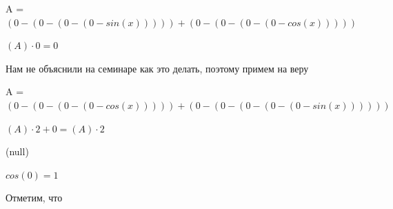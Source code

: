 \documentclass[12pt,a4paper,fleqn]{article}
\begin{document}
\begin{center}
\begin{center}
\begin{center}
\begin{center}
\begin{center}
\begin{center}
\begin{center}
\begin{center}
\begin{center}
\begin{center}
\begin{center}
\begin{center}
\begin{center}
\begin{center}
\begin{center}
\begin{center}
\begin{center}
\begin{center}
\begin{center}
\begin{center}
\begin{center}
\begin{center}
\begin{center}
\begin{center}
\begin{center}
\begin{center}
\begin{center}
\begin{center}
\begin{center}
\begin{center}
\begin{center}
\begin{center}
\begin{center}
\begin{center}
\begin{center}
\begin{center}
\begin{center}
\begin{center}
\begin{center}
\begin{center}
\begin{center}
\begin{center}
\begin{center}
\begin{center}
\begin{center}
\begin{center}
\begin{center}
\begin{center}
\begin{center}
\begin{center}
\begin{center}
\begin{center}
\begin{center}
\begin{center}
\begin{center}
\begin{center}
\begin{center}
\begin{center}
\begin{center}
\begin{center}
\begin{center}
\begin{center}
\begin{center}
\begin{center}
\begin{center}
\begin{center}
\begin{center}
\begin{center}
\begin{center}
\begin{center}
\begin{center}
\begin{center}
\begin{center}
\begin{center}
\begin{center}
\begin{center}
\begin{center}
\begin{center}
\begin{center}
\begin{center}
\begin{center}
A = $(0-(0-(0-(0-sin(x)))))+(0-(0-(0-(0-cos(x)))))$\end{center}
\begin{center}
$(A) \cdot 0 = 0$\end{center}
Нам не объяснили на семинаре как это делать, поэтому примем на веру

\begin{center}
A = $(0-(0-(0-(0-cos(x)))))+(0-(0-(0-(0-(0-sin(x))))))$\end{center}
\begin{center}
$(A) \cdot 2+0 = (A) \cdot 2$\end{center}
(null)\cite{link4}

\begin{center}
\begin{center}$cos(0) = 1$\end{center}
Отметим, что


\end{center}
\end{center}
\end{center}
\end{center}
\end{center}
\end{center}
\end{center}
\end{center}
\end{center}
\end{center}
\end{center}
\end{center}
\end{center}
\end{center}
\end{center}
\end{center}
\end{center}
\end{center}
\end{center}
\end{center}
\end{center}
\end{center}
\end{center}
\end{center}
\end{center}
\end{center}
\end{center}
\end{center}
\end{center}
\end{center}
\end{center}
\end{center}
\end{center}
\end{center}
\end{center}
\end{center}
\end{center}
\end{center}
\end{center}
\end{center}
\end{center}
\end{center}
\end{center}
\end{center}
\end{center}
\end{center}
\end{center}
\end{center}
\end{center}
\end{center}
\end{center}
\end{center}
\end{center}
\end{center}
\end{center}
\end{center}
\end{center}
\end{center}
\end{center}
\end{center}
\end{center}
\end{center}
\end{center}
\end{center}
\end{center}
\end{center}
\end{center}
\end{center}
\end{center}
\end{center}
\end{center}
\end{center}
\end{center}
\end{center}
\end{center}
\end{center}
\end{center}
\end{center}
\end{center}
\end{center}
\end{center}
\end{document}
